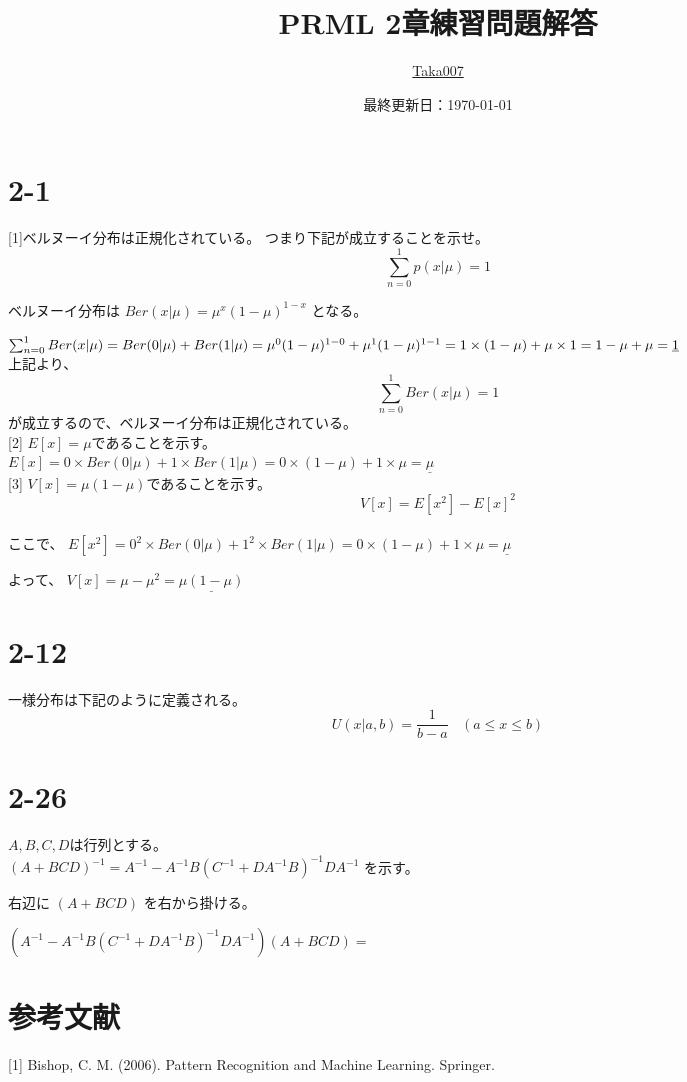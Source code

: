 \documentclass{ltjsarticle}
\title{PRML 2章練習問題解答}
\author{\href{https://github.com/Taka0007}{Taka007}}
\date{最終更新日：\today}
\begin{document}
\maketitle

\tableofcontents
\newpage

\section*{2-1}
[1]ベルヌーイ分布は正規化されている。
つまり下記が成立することを示せ。
$$
\sum_{n=0}^1 p(x| \mu ) = 1
$$

ベルヌーイ分布は
$
Ber(x| \mu) = \mu^x (1-\mu)^{1-x}
$
となる。

$
\sum_{n=0}^1 Ber(x| \mu)
= Ber(0| \mu) + Ber(1| \mu)
= \mu^0 (1-\mu)^{1-0} + \mu^1 (1-\mu)^{1-1}
= 1 \times (1-\mu) + \mu \times 1 \\
= 1-\mu + \mu
= \underline{1}
$
\\
上記より、
$$
\sum_{n=0}^1 Ber(x| \mu) = 1
$$
が成立するので、ベルヌーイ分布は正規化されている。
\\

[2] $E[x] = \mu $であることを示す。\\
$
E[x] = 0 \times Ber(0| \mu) + 1 \times Ber(1| \mu)
= 0 \times (1-\mu) + 1 \times \mu
= \underline{\mu}
$
\\

[3] $V[x] = \mu (1-\mu)$であることを示す。\\
$$
V[x] = E[x^2] - E[x]^2
$$
\\
ここで、
$
E[x^2] = 0^2 \times Ber(0| \mu) + 1^2 \times Ber(1| \mu)
= 0 \times (1-\mu) + 1 \times \mu
= \underline{\mu}
$

よって、
$
V[x] = \mu - \mu^2
= \underline{\mu (1-\mu)}
$



\section*{2-12}
一様分布は下記のように定義される。 \\
$$
U(x|a,b) = \frac{1}{b-a} \ \ \ \ (a \leq x \leq b)
$$






\section*{2-26}
$A,B,C,D$は行列とする。\\
$
(A + BCD)^{-1} 
=  A^{-1} -  A^{-1}B (C^{-1} + D A^{-1} B)^{-1} D A^{-1}
$
を示す。

右辺に
$
(A + BCD)
$
を右から掛ける。

$
(A^{-1} -  A^{-1}B (C^{-1} + D A^{-1} B)^{-1} D A^{-1}) (A + BCD)
= 
$












\section*{参考文献}
[1] Bishop, C. M. (2006). Pattern Recognition and Machine Learning. Springer.
\end{document}
